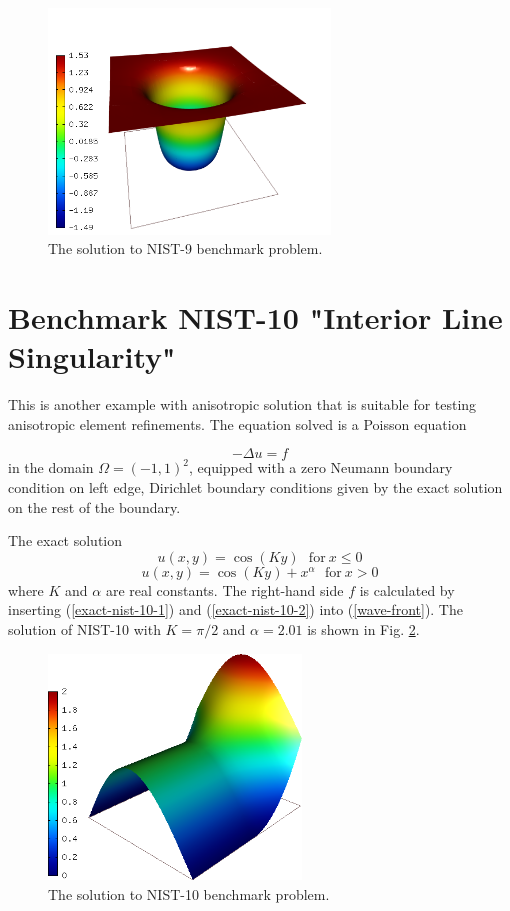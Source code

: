 \documentclass[12pt]{elsarticle}
\begin{document}
\begin{figure}[!ht]
\centering
\includegraphics[height=6cm]{nist/nist-9/solution.png}
\caption{The solution to NIST-9 benchmark problem.}
\label{fig:sln-nist09}
\end{figure}

\section{Benchmark NIST-10 "Interior Line Singularity"}
\label{sec:bench-10}

This is another example with anisotropic solution that is suitable for testing
anisotropic element refinements.
The equation solved is a Poisson equation

\begin{equation} \label{interior}
-\Delta u = f
\end{equation}
in the domain $\Omega = (-1, 1)^2$, equipped with a zero
Neumann boundary condition on left edge, Dirichlet boundary conditions given by the
exact solution on the rest of the boundary.

The exact solution
\begin{equation}\label{exact-nist-10-1}
u(x,y) = \cos(Ky)\ \ \ \mbox{for}\ x \le 0
\end{equation}
\begin{equation}\label{exact-nist-10-2}
u(x,y) = \cos(Ky) + x^{\alpha}\ \ \ \mbox{for}\ x > 0
\end{equation}
where $K$ and $\alpha$ are real constants.
The right-hand side $f$ is calculated by inserting
(\ref{exact-nist-10-1}) and (\ref{exact-nist-10-2}) into (\ref{wave-front}).
The solution of NIST-10 with $K = \pi/2$ and
$\alpha = 2.01$ is shown in Fig. \ref{fig:sln-nist10}.

\begin{figure}[!ht]
\centering
\includegraphics[height=6cm]{nist/nist-10/solution.png}
\caption{The solution to NIST-10 benchmark problem.}
\label{fig:sln-nist10}
\end{figure}
\end{document}
